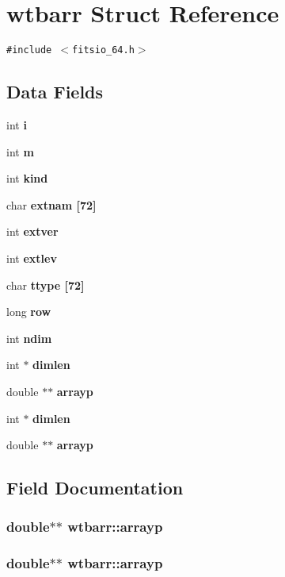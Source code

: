\section{wtbarr Struct Reference}
\label{structwtbarr}
{\tt \#include $<$fitsio\_\-64.h$>$}

\subsection*{Data Fields}
\begin{CompactItemize}
\item 
int \bf{i}
\item 
int \bf{m}
\item 
int \bf{kind}
\item 
char \bf{extnam} [72]
\item 
int \bf{extver}
\item 
int \bf{extlev}
\item 
char \bf{ttype} [72]
\item 
long \bf{row}
\item 
int \bf{ndim}
\item 
int $\ast$ \bf{dimlen}
\item 
double $\ast$$\ast$ \bf{arrayp}
\item 
int $\ast$ \bf{dimlen}
\item 
double $\ast$$\ast$ \bf{arrayp}
\end{CompactItemize}


\subsection{Field Documentation}
\subsubsection{\setlength{\rightskip}{0pt plus 5cm}double$\ast$$\ast$ \bf{wtbarr::arrayp}}\label{structwtbarr_d7d5ac0a7880f57ab1a95a959a1711ec}


\subsubsection{\setlength{\rightskip}{0pt plus 5cm}double$\ast$$\ast$ \bf{wtbarr::arrayp}}\label{structwtbarr_d7d5ac0a7880f57ab1a95a959a1711ec}


